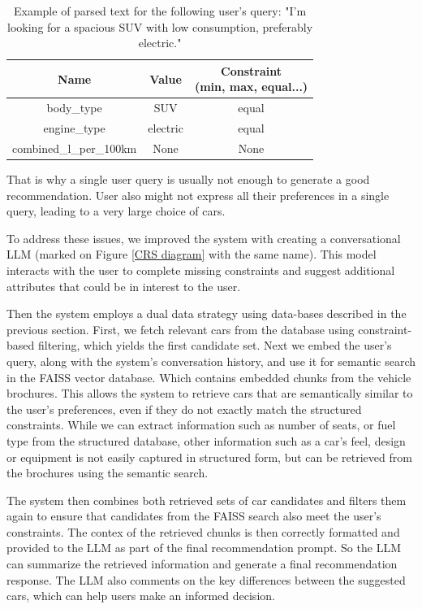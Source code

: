 \documentclass[fleqn,moreauthors,10pt]{ds_report}
\begin{document}
\begin{table}[H]
\resizebox{1.0 \linewidth}{!}
{\begin{tabular}{| c c c |}

\hline
Name & Value & \makecell{Constraint \\ (min, max, equal...)}  \\ 
\hline
body\_type  & SUV & equal  \\
\hline
engine\_type  & electric & equal  \\
\hline
combined\_l\_per\_100km  & None & None  \\
\hline

\end{tabular}}
\caption{
    Example of parsed text for the following user's query: 
    "I'm looking for a spacious SUV with low consumption, preferably electric."
}
\label{tab:parsed query example}
\end{table}
\FloatBarrier

That is why a single user query is usually not enough to generate a good recommendation. User also might not express all their preferences in a single query, leading to a very large choice of cars. 

\vspace{3pt}
\noindent
To address these issues, we improved the system with creating a conversational LLM
(marked on Figure \ref{CRS diagram} with the same name). This model 
interacts with the user to complete missing constraints and suggest additional 
attributes that could be in interest to the user.

Then the system employs a dual data strategy using data-bases described
in the previous section.
First, we fetch relevant cars from the database using constraint-based filtering,
which yields the first candidate set. Next we embed the user's query, along with the system's conversation history, and use it for semantic search in the FAISS vector database. Which contains embedded chunks from the vehicle brochures. This allows the system to retrieve cars that are semantically similar to the user's preferences, even if they do not exactly match the structured constraints. While we can extract information such as number of seats, or fuel type from the structured database, other information such as a car's feel, design or equipment is not easily captured in structured form, but can be retrieved from the brochures using the semantic search.

The system then combines both retrieved sets of car candidates and filters them again to ensure that candidates from the FAISS search also meet the user's constraints. The contex of the retrieved chunks is then correctly formatted and provided to the LLM as part of the final recommendation prompt. So the LLM can summarize the retrieved information and generate a final recommendation response. The LLM also comments on the key differences between the suggested cars, which can help users make an informed decision. 
\end{document}
